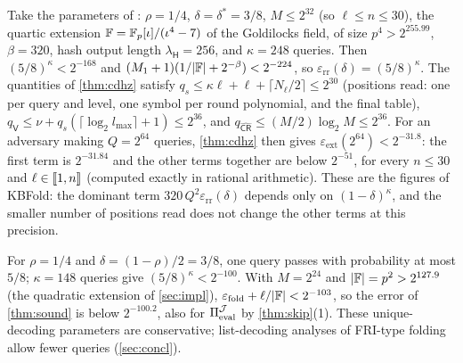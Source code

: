 \begin{remark}\label{rem:pq-params}
Take the parameters of : $\rho = 1/4$, $\delta = \delta^* = 3/8$, $M \le 2^{32}$ (so $\ell \le n \le 30$), the quartic extension $\mathbb{F} = \mathbb{F}_p[\iota]/(\iota^4 - 7)$ of the Goldilocks field, of size $p^4 > 2^{255.99}$, $\beta = 320$, hash output length $\lambda_{\mathsf{H}} = 256$, and $\kappa = 248$ queries.
Then $(5/8)^{\kappa} < 2^{-168}$ and $(M_1+1)(1/|\mathbb{F}| + 2^{-\beta}) < 2^{-224}$, so $\varepsilon_{\mathrm{rr}}(\delta) = (5/8)^\kappa$.
The quantities of \cref{thm:cdhz} satisfy $q_s \le \kappa\ell + \ell + \lceil N_\ell/2 \rceil \le 2^{30}$ (positions read: one per query and level, one symbol per round polynomial, and the final table), $q_{\mathsf{V}} \le \nu + q_s(\lceil\log_2 l_{\max}\rceil + 1) \le 2^{36}$, and $q_{\widehat{\mathsf{CR}}} \le (M/2)\log_2 M \le 2^{36}$.
For an adversary making $Q = 2^{64}$ queries, \cref{thm:cdhz} then gives $\varepsilon_{\mathrm{ext}}(2^{64}) < 2^{-31.8}$: the first term is $2^{-31.84}$ and the other terms together are below $2^{-51}$, for every $n \le 30$ and $\ell \in \llbracket 1, n \rrbracket$ (computed exactly in rational arithmetic).
These are the figures of KBFold: the dominant term $320\, Q^2 \varepsilon_{\mathrm{rr}}(\delta)$ depends only on $(1-\delta)^\kappa$, and the smaller number of positions read does not change the other terms at this precision.
\end{remark}

\begin{remark}[Parameters]\label{rem:params}
For $\rho = 1/4$ and $\delta = (1-\rho)/2 = 3/8$, one query passes with probability at most $5/8$; $\kappa = 148$ queries give $(5/8)^{\kappa} < 2^{-100}$.
With $M = 2^{24}$ and $|\mathbb{F}| = p^2 > 2^{127.9}$ (the quadratic extension of \cref{sec:impl}), $\varepsilon_{\mathrm{fold}} + \ell/|\mathbb{F}| < 2^{-103}$, so the error of \cref{thm:sound} is below $2^{-100.2}$, also for $\Pi_{\mathrm{eval}}^{\mathcal{J}}$ by \cref{thm:skip}(1).
These unique-decoding parameters are conservative; list-decoding analyses of FRI-type folding allow fewer queries (\cref{sec:concl}).
\end{remark}

